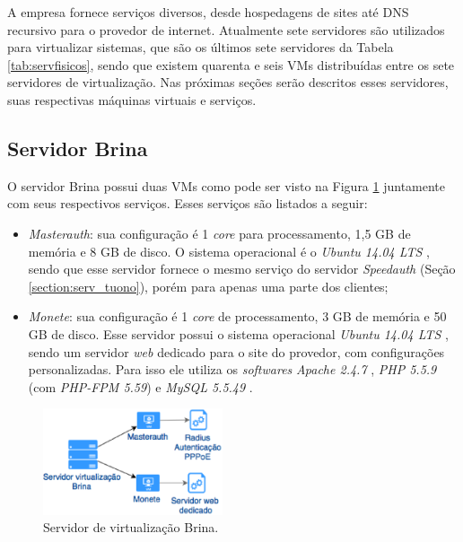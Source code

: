 A empresa fornece serviços diversos, desde hospedagens de sites até \ac{DNS} recursivo para o provedor de internet. Atualmente sete servidores 
são utilizados para virtualizar sistemas, que são os últimos sete servidores da Tabela \ref{tab:servfisicos}, sendo que existem quarenta e seis 
\ac{VM}s distribuídas entre os sete servidores de virtualização. Nas próximas seções serão descritos esses servidores, suas respectivas 
máquinas virtuais e serviços.

\subsection{Servidor Brina}
\label{section:serv_brina}

O servidor Brina possui duas \ac{VM}s como pode ser visto na Figura \ref{fig:servidor_brina} juntamente com seus respectivos serviços. 
Esses serviços são listados a seguir:
\begin{itemize}
 \item \textit{Masterauth}: sua configuração é 1 \textit{core} para processamento, 1,5 GB de memória e 8 GB de disco. O sistema operacional é o 
 \textit{Ubuntu 14.04 \ac{LTS}} \cite{ubuntu}, sendo que esse servidor fornece o mesmo serviço do servidor \textit{Speedauth} 
 (Seção \ref{section:serv_tuono}), porém para apenas uma parte dos clientes;
 
 \item \textit{Monete}: sua configuração é 1 \textit{core} de processamento, 3 GB de memória e 50 GB de disco. Esse servidor possui o 
 sistema operacional \textit{Ubuntu 14.04 \ac{LTS}} \cite{ubuntu}, sendo um servidor \textit{web} dedicado para o site do provedor, com 
 configurações personalizadas. Para isso ele utiliza os \textit{softwares} \textit{Apache 2.4.7} \cite{apache}, \textit{\ac{PHP} 5.5.9} \cite{php} 
 (com \textit{PHP-FPM 5.59}) e \textit{MySQL 5.5.49} \cite{mysql}.
\end{itemize}

\begin{figure}[h!]
 \centering
 \includegraphics[width=200px]{img/servidor_brina.eps}
 \caption{Servidor de virtualização Brina.}
 \label{fig:servidor_brina}
\end{figure}

